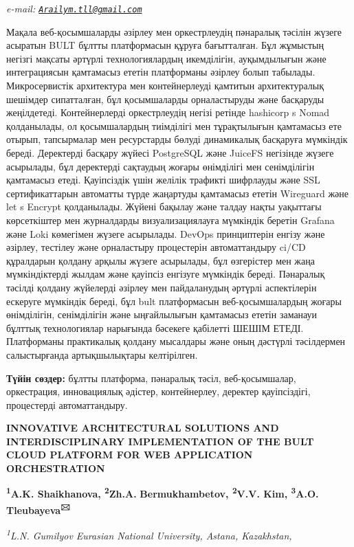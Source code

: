 \documentclass[
]{article}
\begin{document}
\emph{e-mail:
\href{mailto:Arailym.tll@gmail.com}{\nolinkurl{Arailym.tll@gmail.com}}}

Мақала веб-қосымшаларды әзірлеу мен оркестрлеудің пәнаралық тәсілін
жүзеге асыратын BULT бұлтты платформасын құруға бағытталған. Бұл
жұмыстың негізгі мақсаты әртүрлі технологиялардың икемділігін,
ауқымдылығын және интеграциясын қамтамасыз ететін платформаны әзірлеу
болып табылады. Микросервистік архитектура мен контейнерлеуді қамтитын
архитектуралық шешімдер сипатталған, бұл қосымшаларды орналастыруды және
басқаруды жеңілдетеді. Контейнерлерді оркестрлеудің негізі ретінде
hashicorp \textquotesingle{} s Nomad қолданылады, ол қосымшалардың
тиімділігі мен тұрақтылығын қамтамасыз ете отырып, тапсырмалар мен
ресурстарды бөлуді динамикалық басқаруға мүмкіндік береді. Деректерді
басқару жүйесі PostgreSQL және JuiceFS негізінде жүзеге асырылады, бұл
деректерді сақтаудың жоғары өнімділігі мен сенімділігін қамтамасыз
етеді. Қауіпсіздік үшін желілік трафикті шифрлауды және SSL
сертификаттарын автоматты түрде жаңартуды қамтамасыз ететін Wireguard
және let \textquotesingle{} s Encrypt қолданылады. Жүйені бақылау және
талдау нақты уақыттағы көрсеткіштер мен журналдарды визуализациялауға
мүмкіндік беретін Grafana және Loki көмегімен жүзеге асырылады. DevOps
принциптерін енгізу және әзірлеу, тестілеу және орналастыру процестерін
автоматтандыру ci/CD құралдарын қолдану арқылы жүзеге асырылады, бұл
өзгерістер мен жаңа мүмкіндіктерді жылдам және қауіпсіз енгізуге
мүмкіндік береді. Пәнаралық тәсілді қолдану жүйелерді әзірлеу мен
пайдаланудың әртүрлі аспектілерін ескеруге мүмкіндік береді, бұл bult
платформасын веб-қосымшалардың жоғары өнімділігін, сенімділігін және
ыңғайлылығын қамтамасыз ететін заманауи бұлттық технологиялар нарығында
бәсекеге қабілетті ШЕШІМ ЕТЕДІ. Платформаны практикалық қолдану
мысалдары және оның дәстүрлі тәсілдермен салыстырғанда артықшылықтары
келтірілген.

\textbf{Түйін сөздер:} бұлтты платформа, пәнаралық тәсіл,
веб-қосымшалар, оркестрация, инновациялық әдістер, контейнерлеу,
деректер қауіпсіздігі, процестерді автоматтандыру.

\textbf{INNOVATIVE ARCHITECTURAL SOLUTIONS AND INTERDISCIPLINARY
IMPLEMENTATION OF THE BULT CLOUD PLATFORM FOR WEB APPLICATION
ORCHESTRATION}

\textbf{\textsuperscript{1}A.K. Shaikhanova, \textsuperscript{2}Zh.A.}
\textbf{Bermukhambetov, \textsuperscript{2}V.V. Kim,
\textsuperscript{3}A.O. Tleubayeva\textsuperscript{🖂}}

\emph{\textsuperscript{1}L.N. Gumilyov Eurasian National University,
Astana, Kazakhstan,}
\end{document}
